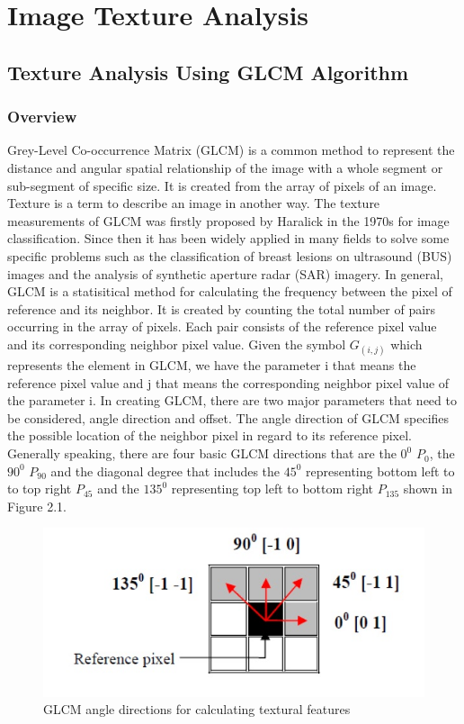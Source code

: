 
\renewcommand{\thechapter}{2}
\thispagestyle{empty}
\chapter{Image Texture Analysis}

\section{Texture Analysis Using GLCM Algorithm}

\subsection{Overview}
Grey-Level Co-occurrence Matrix (GLCM) is a common method to represent the distance and angular spatial relationship of the image with a whole segment or sub-segment of specific size. It is created from the array of pixels of an image. Texture is a term to describe an image in another way. The texture measurements of GLCM was firstly proposed by Haralick in the 1970s for image classification\cite{Haralick}. Since then it has been widely applied in many fields to solve some specific problems such as the classification of breast lesions on ultrasound (BUS) images\cite{Gomez} and the analysis of synthetic aperture radar (SAR) imagery\cite{Umasankar}. In general, GLCM is a statisitical method for calculating the frequency between the pixel of reference and its neighbor. It is created by counting the total number of pairs occurring in the array of pixels. Each pair consists of the reference pixel value and its corresponding neighbor pixel value. Given the symbol $G_{(i,j)}$ which represents the element in GLCM,  we have the parameter i that means the reference pixel value and j that means the corresponding neighbor pixel value of the parameter i. In creating GLCM, there are two major parameters that need to be considered, angle direction and offset. The angle direction of GLCM specifies the possible location of the neighbor pixel in regard to its reference pixel. Generally speaking, there are four basic GLCM directions that are the $0^0$ $P_0$, the $90^0$ $P_{90}$ and the diagonal degree that includes the $45^0$ representing bottom left to to top right $P_{45}$ and the $135^0$ representing top left to bottom right $P_{135}$ shown in Figure 2.1. 
\begin{figure}[!t]
\includegraphics{GLCM_direction_sample}
\caption{GLCM angle directions for calculating textural features\cite{Biswajit}}
\end{figure}

